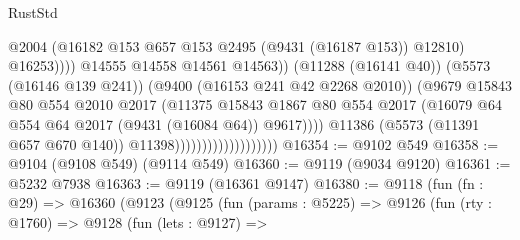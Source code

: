 \begin{lexlean}{RustStd}
\begin{coremodule}
                                                        @2004
                                                        (@16182
                                                          @153
                                                          @657
                                                          @153
                                                          @2495
                                                          (@9431 (@16187 @153))
                                                          @12810)
                                                        @16253))))
                                                @14555
                                                @14558
                                                @14561
                                                @14563))
                                            (@11288 (@16141 @40))
                                            (@5573 (@16146 @139 @241))
                                            (@9400 (@16153 @241 @42 @2268 @2010))
                                            (@9679
                                              @15843
                                              @80
                                              @554
                                              @2010
                                              @2017
                                              (@11375
                                                @15843
                                                @1867
                                                @80
                                                @554
                                                @2017
                                                (@16079
                                                  @64
                                                  @554
                                                  @64
                                                  @2017
                                                  (@9431 (@16084 @64))
                                                  @9617))))
                                          @11386
                                          (@5573 (@11391 @657 @670 @140))
                                          @11398)))))))))))))))))))
@16354 := @9102 @549
@16358 := @9104 (@9108 @549) (@9114 @549)
@16360 := @9119 (@9034 @9120)
@16361 := @5232 @7938
@16363 := @9119 (@16361 @9147)
@16380 := @9118
    (fun (fn : @29) =>
    @16360
      (@9123
        (@9125
          (fun (params : @5225) =>
          @9126
            (fun (rty : @1760) =>
            @9128
              (fun (lets : @9127) =>

\end{coremodule}
\end{lexlean}

